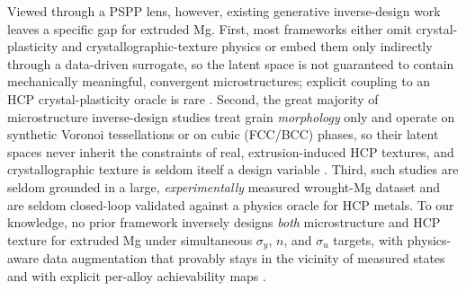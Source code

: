 \documentclass[preprint,12pt]{elsarticle}
\begin{document}
Viewed through a PSPP lens, however, existing generative inverse-design work leaves a specific gap for extruded Mg. First, most frameworks either omit crystal-plasticity and crystallographic-texture physics or embed them only indirectly through a data-driven surrogate, so the latent space is not guaranteed to contain mechanically meaningful, convergent microstructures; explicit coupling to an HCP crystal-plasticity oracle is rare \cite{Kusampudi-Diehl-2023,Roters-DAMASK-2019,Generative-crystal-review}. Second, the great majority of microstructure inverse-design studies treat grain \emph{morphology} only and operate on synthetic Voronoi tessellations or on cubic (FCC/BCC) phases, so their latent spaces never inherit the constraints of real, extrusion-induced HCP textures, and crystallographic texture is seldom itself a design variable \cite{MIRZAEE2025120704,VLASSIS2023116126}. Third, such studies are seldom grounded in a large, \emph{experimentally} measured wrought-Mg dataset and are seldom closed-loop validated against a physics oracle for HCP metals. To our knowledge, no prior framework inversely designs \emph{both} microstructure and HCP texture for extruded Mg under simultaneous $\sigma_y$, $n$, and $\sigma_u$ targets, with physics-aware data augmentation that provably stays in the vicinity of measured states and with explicit per-alloy achievability maps {\color{red}\cite{CoPiLOT2026,Guru2025}}.
\end{document}
